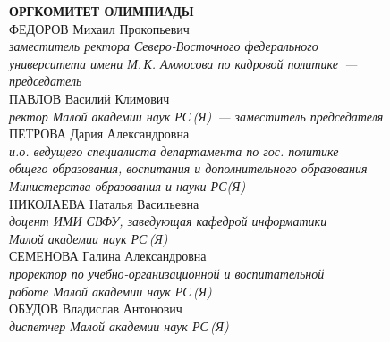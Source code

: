 \newpage
\noindent
\textbf{ОРГКОМИТЕТ ОЛИМПИАДЫ}
\\[3mm]
ФЕДОРОВ Михаил Прокопьевич \\ 
\textit{заместитель ректора Северо-Восточного федерального \\
университета имени М.\,К. Аммосова по кадровой политике~--- \\
председатель}
\\[3mm]
ПАВЛОВ Василий Климович \\
\textit{ректор Малой академии наук РС\,(Я)~--- заместитель председателя}
\\[3mm]
ПЕТРОВА Дария Александровна \\
\textit{и.о. ведущего специалиста департамента по гос. политике \\
общего образования, воспитания и дополнительного образования \\
Министерства образования и науки РС(Я)}
\\[3mm]
НИКОЛАЕВА Наталья Васильевна \\
\textit{доцент ИМИ СВФУ, заведующая кафедрой информатики \\
Малой академии наук РС\,(Я)}
\\[3mm]
СЕМЕНОВА Галина Александровна \\
\textit{проректор по учебно-организационной и воспитательной \\ 
работе Малой академии наук РС\,(Я)} 
\\[3mm]
ОБУДОВ Владислав Антонович \\
\textit{диспетчер  Малой академии наук РС\,(Я)}
\\[3mm]

\newpage

